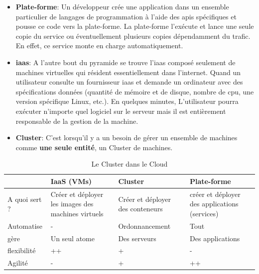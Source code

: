 \begin{onehalfspace}
\begin{itemize}
	\item {} \textbf{Plate-forme}: Un développeur crée une application dans un ensemble particulier de langages de programmation à l'aide des \acrshort{api}s spécifiques et pousse ce code vers la plate-forme. La plate-forme l'exécute et lance une seule copie du service ou éventuellement plusieurs copies dépendamment du trafic. En effet, ce service monte en charge automatiquement. 
	\item {} \textbf{\acrshort{iaas}}: A l'autre bout du pyramide se trouve l'\acrshort{iaas} composé seulement de machines virtuelles qui résident essentiellement dans l'internet. Quand un utilisateur consulte un fournisseur \acrshort{iaas} et demande  un ordinateur avec des spécifications données (quantité de mémoire et de disque, nombre de \acrshort{cpu}, une version spécifique Linux, etc.). En quelques minutes, L'utilisateur pourra  exécuter n'importe quel logiciel sur le serveur mais il est entièrement responsable de la gestion de la machine.
	\item \textbf{Cluster}: C'est lorsqu'il y a un besoin de gérer un ensemble de machines comme \textbf{une seule entité}, un Cluster de machines.

\end{itemize}


\def\arraystretch{1.6}%

{
\begin{center}
\begin{table}[H]

	\begin{tabu}{| X[c] | X[c] | X[c] | X[c] |} 


	\hline
	\textbf{} & \textbf{IaaS (VMs)} & \textbf{Cluster} & \textbf{Plate-forme}\\ [0.95ex] 
	\hline\hline
	A quoi sert ? 	& Créer et déployer les images des machines virtuels & Créer et déployer des conteneurs & créer et déployer des applications (services) \\ 
	Automatise					& - & Ordonnancement & Tout \\ 
	gère					& Un seul atome & Des serveurs & Des applications \\ 
	flexibilité					& ++ 	& + 	& - \\ 
	Agilité						& - 	& + 	& ++ \\ 
	\hline
	\end{tabu}
	\caption{Le Cluster dans le Cloud}
	\label{tab:table_label}


\end{table}
\end{center}}
\end{onehalfspace}
